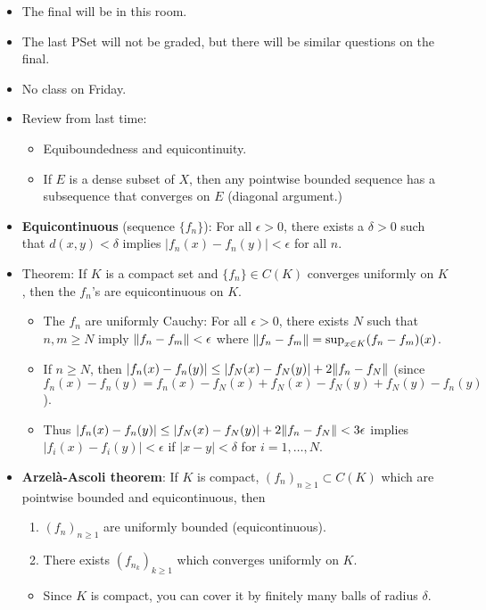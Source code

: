\documentclass[../../notes.tex]{subfiles}
\begin{document}
\begin{itemize}
    \item {}The final will be in this room.
    \item The last PSet will not be graded, but there will be similar questions on the final.
    \item No class on Friday.
    \item Review from last time:
    \begin{itemize}
        \item Equiboundedness and equicontinuity.
        \item If $E$ is a dense subset of $X$, then any pointwise bounded sequence has a subsequence that converges on $E$ (diagonal argument.)
    \end{itemize}
    \item \textbf{Equicontinuous} (sequence $\{f_n\}$): For all $\epsilon>0$, there exists a $\delta>0$ such that $d(x,y)<\delta$ implies $|f_n(x)-f_n(y)|<\epsilon$ for all $n$.
    \item Theorem: If $K$ is a compact set and $\{f_n\}\in C(K)$ converges uniformly on $K$, then the $f_n$'s are equicontinuous on $K$.
    \begin{itemize}
        \item The $f_n$ are uniformly Cauchy: For all $\epsilon>0$, there exists $N$ such that $n,m\geq N$ imply $\norm{f_n-f_m}<\epsilon$ where $\norm{f_n-f_m}=\sup_{x\in K}(f_n-f_m)(x)$.
        \item If $n\geq N$, then $|f_n(x)-f_n(y)|\leq|f_N(x)-f_N(y)|+2\norm{f_n-f_N}$ (since $f_n(x)-f_n(y)=f_n(x)-f_N(x)+f_N(x)-f_N(y)+f_N(y)-f_n(y)$).
        \item Thus $|f_n(x)-f_n(y)|\leq|f_N(x)-f_N(y)|+2\norm{f_n-f_N}<3\epsilon$ implies $|f_i(x)-f_i(y)|<\epsilon$ if $|x-y|<\delta$ for $i=1,\dots,N$.
    \end{itemize}
    \item \textbf{Arzel\`{a}-Ascoli theorem}: If $K$ is compact, $(f_n)_{n\geq 1}\subset C(K)$ which are pointwise bounded and equicontinuous, then
    \begin{enumerate}[label={(\alph*)}]
        \item $(f_n)_{n\geq 1}$ are uniformly bounded (equicontinuous).
        \item There exists $(f_{n_k})_{k\geq 1}$ which converges uniformly on $K$.
    \end{enumerate}
    \begin{itemize}
        \item Since $K$ is compact, you can cover it by finitely many balls of radius $\delta$.

\end{itemize}
\end{itemize}
\end{document}
